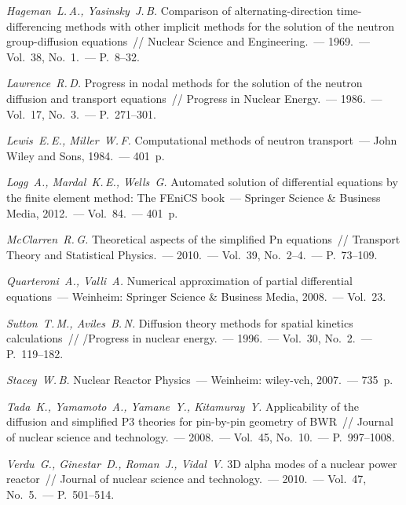 \documentclass{crm-article}
\begin{document}
\begin{thebibliography}
 {\it Hageman~L.\,A., Yasinsky~J.\,B.} Comparison of alternating-direction time-differencing methods with other implicit methods for the solution of the neutron group-diffusion equations~// Nuclear Science and Engineering.~--- 1969.~--- Vol.~38, No.~1.~--- P.~8--32.

 {\it Lawrence~R.\,D.} Progress in nodal methods for the solution of the neutron diffusion and transport equations~// Progress in Nuclear Energy.~--- 1986.~--- Vol.~17, No.~3.~--- P.~271--301.

 {\it Lewis~E.\,E., Miller~W.\,F.} Computational methods of neutron transport~--- John Wiley and Sons, 1984.~--- 401~p.

 {\it Logg~A., Mardal~K.\,E., Wells~G.} Automated solution of differential equations by the finite element method: The FEniCS book~--- Springer Science \& Business Media, 2012.~--- Vol.~84.~--- 401~p.

 {\it McClarren~R.\,G.} Theoretical aspects of the simplified Pn equations~// Transport Theory and Statistical Physics.~--- 2010.~--- Vol.~39, No.~2--4.~--- P.~73--109.

 {\it Quarteroni~A., Valli~A.} Numerical approximation of partial differential equations~--- Weinheim: Springer Science \& Business Media, 2008.~--- Vol.~23.

 {\it Sutton~T.\,M., Aviles~B.\,N.} Diffusion theory methods for spatial kinetics calculations~// /Progress in nuclear energy.~--- 1996.~--- Vol.~30, No.~2.~--- P.~119--182.

 {\it Stacey~W.\,B.} Nuclear Reactor Physics~--- Weinheim: wiley-vch, 2007.~--- 735~p.

 {\it Tada~K., Yamamoto~A., Yamane~Y., Kitamuray~Y.} Applicability of the diffusion and simplified P3 theories for pin-by-pin geometry of BWR~// Journal of nuclear science and technology.~--- 2008.~--- Vol.~45, No.~10.~--- P.~997--1008.

 {\it Verdu~G., Ginestar~D., Roman~J., Vidal~V.} 3D alpha modes of a nuclear power reactor~// Journal of nuclear science and technology.~--- 2010.~--- Vol.~47, No.~5.~--- P.~501--514.


\end{thebibliography}
\end{document}
